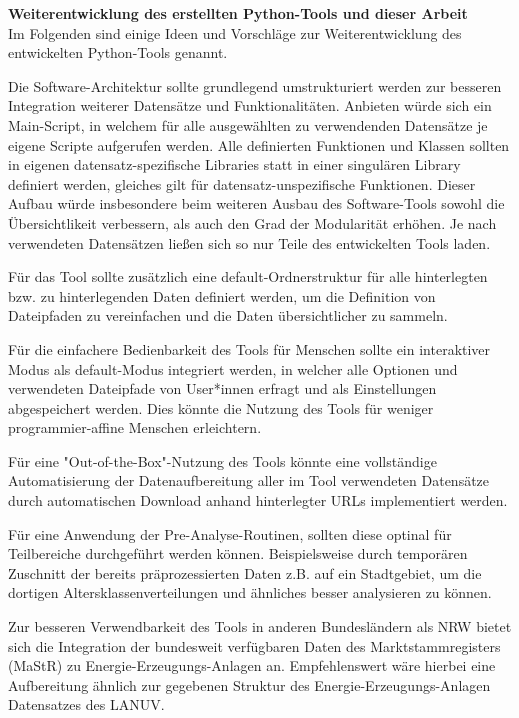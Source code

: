 		\textbf{Weiterentwicklung des erstellten Python-Tools und dieser Arbeit}\\
		Im Folgenden sind einige Ideen und Vorschläge zur Weiterentwicklung des entwickelten Python-Tools genannt. 
		
		Die Software-Architektur sollte grundlegend umstrukturiert werden zur besseren Integration weiterer Datensätze und Funktionalitäten. Anbieten würde sich ein Main-Script, in welchem für alle ausgewählten zu verwendenden Datensätze je eigene Scripte aufgerufen werden. Alle definierten Funktionen und Klassen sollten in eigenen datensatz-spezifische Libraries statt in einer singulären Library definiert werden, gleiches gilt für datensatz-unspezifische Funktionen. Dieser Aufbau würde insbesondere beim weiteren Ausbau des Software-Tools sowohl die Übersichtlikeit verbessern, als auch den Grad der Modularität erhöhen. Je nach verwendeten Datensätzen ließen sich so nur Teile des entwickelten Tools laden. 
		
		Für das Tool sollte zusätzlich eine default-Ordnerstruktur für alle hinterlegten bzw. zu hinterlegenden Daten definiert werden, um die Definition von Dateipfaden zu vereinfachen und die Daten übersichtlicher zu sammeln. 
		
		Für die einfachere Bedienbarkeit des Tools für Menschen sollte ein interaktiver Modus als default-Modus integriert werden, in welcher alle Optionen und verwendeten Dateipfade von User*innen erfragt und als Einstellungen abgespeichert werden. Dies könnte die Nutzung des Tools für weniger programmier-affine Menschen erleichtern. 
		
		Für eine "Out-of-the-Box"-Nutzung des Tools könnte eine vollständige Automatisierung der Datenaufbereitung aller im Tool verwendeten Datensätze durch automatischen Download anhand hinterlegter URLs implementiert werden. 
		
		Für eine Anwendung der Pre-Analyse-Routinen, sollten diese optinal für Teilbereiche durchgeführt werden können. Beispielsweise durch temporären Zuschnitt der bereits präprozessierten Daten z.B. auf ein Stadtgebiet, um die dortigen Altersklassenverteilungen und ähnliches besser analysieren zu können.
		
		Zur besseren Verwendbarkeit des Tools in anderen Bundesländern als NRW bietet sich die Integration der bundesweit verfügbaren Daten des Marktstammregisters (MaStR) zu Energie-Erzeugungs-Anlagen an. Empfehlenswert wäre hierbei eine Aufbereitung ähnlich zur gegebenen Struktur des Energie-Erzeugungs-Anlagen Datensatzes des LANUV. 
		
